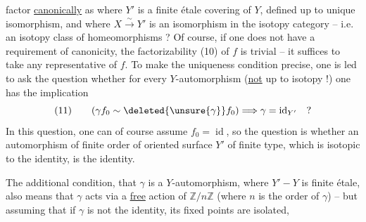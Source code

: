 factor \uline{canonically} as
where $Y'$ is a finite étale covering of $Y$, defined up to unique isomorphism, and where $X\xrightarrow{\sim}Y'$ is an isomorphism in the isotopy category -- i.e. an isotopy class of homeomorphisms ? Of course, if one does not have a requirement of canonicity, the factorizability (10) of $f$ is trivial -- it suffices to take any representative of $f$.  To make the  uniqueness condition precise, one is led to ask the question whether for every $Y$-automorphism    (\uline{not} up to isotopy !)  one has the implication
\[
(11)\qquad (\gamma f_0\sim\deleted{\unsure{\gamma}}f_0)\Longrightarrow\gamma=\operatorname{id}_{Y'}\quad ?
\]
In this question, one can of course assume $f_0=\operatorname{id}$, so the question is whether an automorphism of finite order \inserted{$\gamma$} of   oriented surface $Y'$ of finite type, which is isotopic to the identity, is the identity.

The additional condition, that $\gamma$ is a $Y$-automorphism, where $Y'\mathbin{-}Y$ is finite étale, also means that $\gamma$ acts via a \uline{free} action of $\mathbb{Z}/n\mathbb{Z}$ (where $n$ is the order of $\gamma$) -- but assuming that if $\gamma$  is not the identity, its fixed points are isolated,
